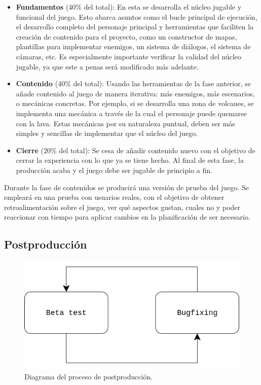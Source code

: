 \begin{itemize}
    \item \textbf{Fundamentos} (40\% del total): En esta se desarrolla el núcleo jugable y funcional del juego. Esto abarca asuntos como el bucle principal de ejecución, el desarrollo completo del personaje principal y herramientas que faciliten la creación de contenido para el proyecto, como un constructor de mapas, plantillas para implementar enemigos, un sistema de diálogos, el sistema de cámaras, etc. Es especialmente importante verificar la calidad del núcleo jugable, ya que este a penas será modificado más adelante.
    \item \textbf{Contenido} (40\% del total): Usando las herramientas de la fase anterior, se añade contenido al juego de manera iterativa: más enemigos, más escenarios, o mecánicas concretas. Por ejemplo, si se desarrolla una zona de volcanes, se implementa una mecánica a través de la cual el personaje puede quemarse con la lava. Estas mecánicas por su naturaleza puntual, deben ser más simples y sencillas de implementar que el núcleo del juego.
    \item \textbf{Cierre} (20\% del total): Se cesa de añadir contenido nuevo con el objetivo de cerrar la experiencia con lo que ya se tiene hecho. Al final de esta fase, la producción acaba y el juego debe ser jugable de principio a fin.
\end{itemize}

Durante la fase de contenidos se producirá una versión de prueba del juego. Se empleará en una prueba con usuarios reales, con el objetivo de obtener retroalimentación sobre el juego, ver qué aspectos gustan, cuales no y poder reaccionar con tiempo para aplicar cambios en la planificación de ser necesario.

\subsection{Postproducción}

\begin{figure}[H]
    \centering
    \includegraphics[scale=0.50]{img/postproduction.drawio.png}
    \caption[Diagrama de postproducción]{Diagrama del proceso de postproducción.}
    \label{fig:postproduction}
\end{figure}

